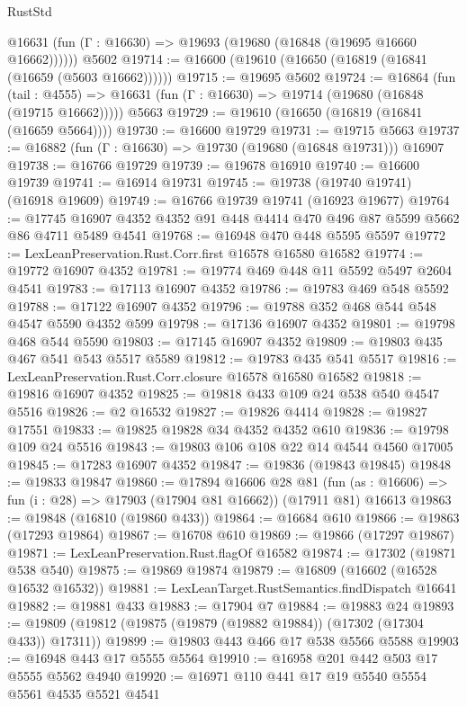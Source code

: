 \begin{lexlean}{RustStd}
\begin{coremodule}
{\begin{coremodule}
{{{{{{{{{{{{{{{{{{{{{{{{{{{{{{{{{{{{{{{{{{{{{{{{{{{{{{{      @16631 (fun (Γ : @16630) => @19693 (@19680 (@16848 (@19695 @16660 @16662))))))
    @5602
@19714 := @16600 (@19610 (@16650 (@16819 (@16841 (@16659 (@5603 @16662))))))
@19715 := @19695 @5602
@19724 := @16864
    (fun (tail : @4555) => @16631 (fun (Γ : @16630) => @19714 (@19680 (@16848 (@19715 @16662)))))
    @5663
@19729 := @19610 (@16650 (@16819 (@16841 (@16659 @5664))))
@19730 := @16600 @19729
@19731 := @19715 @5663
@19737 := @16882 (fun (Γ : @16630) => @19730 (@19680 (@16848 @19731))) @16907
@19738 := @16766 @19729
@19739 := @19678 @16910
@19740 := @16600 @19739
@19741 := @16914 @19731
@19745 := @19738 (@19740 @19741) (@16918 @19609)
@19749 := @16766 @19739 @19741 (@16923 @19677)
@19764 := @17745 @16907 @4352 @4352 @91 @448 @4414 @470 @496 @87 @5599 @5662 @86 @4711 @5489 @4541
@19768 := @16948 @470 @448 @5595 @5597
@19772 := LexLeanPreservation.Rust.Corr.first @16578 @16580 @16582
@19774 := @19772 @16907 @4352
@19781 := @19774 @469 @448 @11 @5592 @5497 @2604 @4541
@19783 := @17113 @16907 @4352
@19786 := @19783 @469 @548 @5592
@19788 := @17122 @16907 @4352
@19796 := @19788 @352 @468 @544 @548 @4547 @5590 @4352 @599
@19798 := @17136 @16907 @4352
@19801 := @19798 @468 @544 @5590
@19803 := @17145 @16907 @4352
@19809 := @19803 @435 @467 @541 @543 @5517 @5589
@19812 := @19783 @435 @541 @5517
@19816 := LexLeanPreservation.Rust.Corr.closure @16578 @16580 @16582
@19818 := @19816 @16907 @4352
@19825 := @19818 @433 @109 @24 @538 @540 @4547 @5516
@19826 := @2 @16532
@19827 := @19826 @4414
@19828 := @19827 @17551
@19833 := @19825 @19828 @34 @4352 @4352 @610
@19836 := @19798 @109 @24 @5516
@19843 := @19803 @106 @108 @22 @14 @4544 @4560 @17005
@19845 := @17283 @16907 @4352
@19847 := @19836 (@19843 @19845)
@19848 := @19833 @19847
@19860 := @17894
    @16606
    @28
    @81
    (fun (as : @16606) => fun (i : @28) => @17903 (@17904 @81 @16662))
    (@17911 @81)
    @16613
@19863 := @19848 (@16810 (@19860 @433))
@19864 := @16684 @610
@19866 := @19863 (@17293 @19864)
@19867 := @16708 @610
@19869 := @19866 (@17297 @19867)
@19871 := LexLeanPreservation.Rust.flagOf @16582
@19874 := @17302 (@19871 @538 @540)
@19875 := @19869 @19874
@19879 := @16809 (@16602 (@16528 @16532 @16532))
@19881 := LexLeanTarget.RustSemantics.findDispatch @16641
@19882 := @19881 @433
@19883 := @17904 @7
@19884 := @19883 @24
@19893 := @19809 (@19812 (@19875 (@19879 (@19882 @19884)) (@17302 (@17304 @433)) @17311))
@19899 := @19803 @443 @466 @17 @538 @5566 @5588
@19903 := @16948 @443 @17 @5555 @5564
@19910 := @16958 @201 @442 @503 @17 @5555 @5562 @4940
@19920 := @16971 @110 @441 @17 @19 @5540 @5554 @5561 @4535 @5521 @4541
}}}}}}}}}}}}}}}}}}}}}}}}}}}}}}}}}}}}}}}}}}}}}}}}}}}}}}}
\end{coremodule}}
\end{coremodule}
\end{lexlean}
